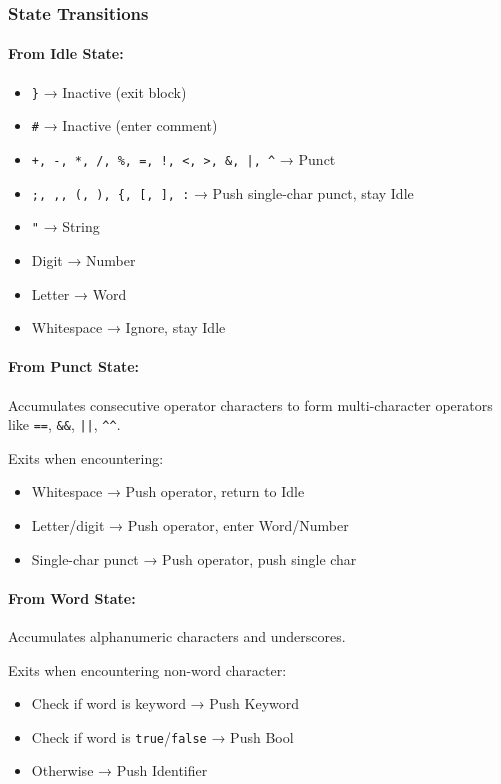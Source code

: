 \documentclass[11pt,a4paper]{article}
\begin{document}
\subsubsection{State Transitions}

\paragraph{From Idle State:}
\begin{itemize}
    \item \texttt{\}} → Inactive (exit block)
    \item \texttt{\#} → Inactive (enter comment)
    \item \texttt{+, -, *, /, \%, =, !, <, >, \&, |, \^} → Punct
    \item \texttt{;, ,, (, ), \{, [, ], :} → Push single-char punct, stay Idle
    \item \texttt{"} → String
    \item Digit → Number
    \item Letter → Word
    \item Whitespace → Ignore, stay Idle
\end{itemize}

\paragraph{From Punct State:}
Accumulates consecutive operator characters to form multi-character operators like \texttt{==}, \texttt{\&\&}, \texttt{||}, \texttt{\textasciicircum\textasciicircum}.

Exits when encountering:
\begin{itemize}
    \item Whitespace → Push operator, return to Idle
    \item Letter/digit → Push operator, enter Word/Number
    \item Single-char punct → Push operator, push single char
\end{itemize}

\paragraph{From Word State:}
Accumulates alphanumeric characters and underscores.

Exits when encountering non-word character:
\begin{itemize}
    \item Check if word is keyword → Push Keyword
    \item Check if word is \texttt{true}/\texttt{false} → Push Bool
    \item Otherwise → Push Identifier
\end{itemize}
\end{document}
